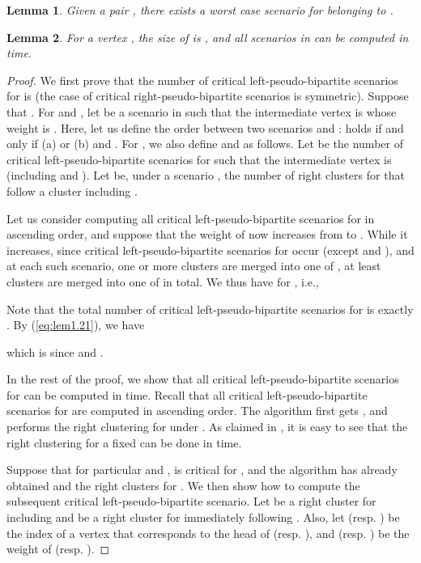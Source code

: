 \documentclass[a4paper]{llncs}
\newtheorem{lem}{Lemma}
\begin{document}
\begin{lem}
Given a pair , there exists a worst case scenario for  belonging to .
\label{lem:wcsxy2}
\end{lem}
\begin{lem}
For a vertex , 
the size of  is ,
and all scenarios in  can be computed in  time.
\label{lem:csy}
\end{lem}
\begin{proof}
We first prove that 
the number of critical left-pseudo-bipartite scenarios for  is 
(the case of critical right-pseudo-bipartite scenarios is symmetric).
Suppose that .
For  and , let 
 be a scenario in 
such that the intermediate vertex is  whose weight is .
Here, let us define the order between two scenarios  and :
 holds if and only if 
(a)  or 
(b)  and . 
For , we also define  and  as follows.
Let  be the number of critical left-pseudo-bipartite scenarios for  such that the intermediate vertex is 
(including  and ).
Let  be, under a scenario , the number of right clusters for  that follow a cluster including .



Let us consider computing all critical left-pseudo-bipartite scenarios for  in ascending order,
and suppose that the weight of  now increases from  to .
While it increases,
since  critical left-pseudo-bipartite scenarios for  occur (except  and ),
and at each such scenario, one or more clusters are merged into one of ,
at least  clusters are merged into one of  in total.
We thus have  for , i.e.,

Note that the total number of critical left-pseudo-bipartite scenarios for  is exactly .
By (\ref{eq:lem1.21}), we have 

which is  since  and .

In the rest of the proof, we show that all critical left-pseudo-bipartite scenarios for  can be computed in  time.
Recall that all critical left-pseudo-bipartite scenarios for  are computed in ascending order.
The algorithm first gets ,
and performs the right clustering for  under .
As claimed in \cite{hgk14_2,hgk14_4}, it is easy to see that the right clustering for a fixed  can be done in  time.



Suppose that for particular  and ,  is critical for ,
and the algorithm has already obtained  and the right clusters for .
We then show how to compute the subsequent critical left-pseudo-bipartite scenario.
Let  be a right cluster for  including  and  be a right cluster for  immediately following .
Also, let  (resp. ) be the index of a vertex that corresponds to the head of  (resp. ),
and  (resp. ) be the weight of  (resp. ).


\end{proof}
\end{document}
